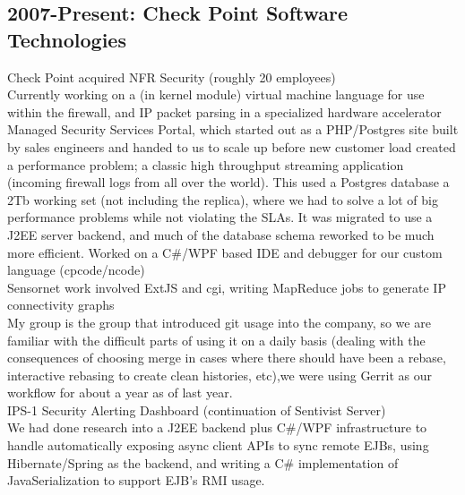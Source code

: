 \documentclass[margin]{res}
\begin{document}
\begin{resume}
\subsection{2007-Present: Check Point Software Technologies}
Check Point acquired NFR Security (roughly 20 employees) \\
Currently working on a (in kernel module) virtual machine language for use within the firewall,
and IP packet parsing in a specialized hardware accelerator \\
Managed Security Services Portal, which started out as a PHP/Postgres
site built by sales engineers and handed to us to scale up before
new customer load created a performance problem; a classic high throughput
streaming application (incoming firewall logs from all over the world).
This used a Postgres database a 2Tb working set (not including the replica),
where we had to solve a lot of big performance problems while not violating the SLAs.  It was migrated to use a J2EE server backend, and
much of the database schema reworked to be much more efficient. 
Worked on a C\#/WPF based IDE and debugger for our custom language (cpcode/ncode) \\
Sensornet work involved ExtJS and cgi, writing MapReduce
jobs to generate IP connectivity graphs \\
My group is the group that introduced git usage into the company,
so we are familiar with the difficult parts of using it on a daily basis
(dealing with the consequences of choosing merge in cases where there
should have been a rebase, interactive rebasing to create clean histories, etc),we were using Gerrit as our workflow for about a year as of last year. \\

IPS-1 Security Alerting Dashboard (continuation of Sentivist Server) \\
We had done research into a J2EE backend plus C\#/WPF infrastructure
to handle automatically exposing async client APIs to sync remote EJBs,
using Hibernate/Spring as the backend, and writing a C\# implementation
of JavaSerialization to support EJB's RMI usage.


\end{resume}
\end{document}
